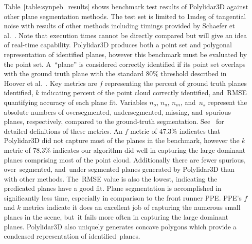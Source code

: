 Table~\ref{table:synpeb_results} shows benchmark test results of Polylidar3D against other plane segmentation methods. The test set is limited to 1mdeg of tangential noise with results of other methods including timings provided by Schaefer et al.~\cite{schaefer_maximum_2019}.  Note that execution times cannot be directly compared but will give an idea of real-time capability. Polylidar3D produces both a point set and polygonal representation of identified planes, however this benchmark must be evaluated by the point set.   A~``plane'' is considered correctly identified if its point set overlaps with the ground truth plane with the standard 80\% threshold described in Hoover et al.~\cite{hoover_experimental_1996}. Key metrics are $f$ representing the percent of ground truth planes identified, $k$ indicating percent of the point cloud correctly identified, and~RMSE quantifying accuracy of each plane fit. Variables $n_o$, $n_u$, $n_m$, and~$n_s$ represent the absolute numbers of  oversegmented,  undersegmented,  missing,  and~spurious  planes, respectively,  compared  to  the  ground-truth  segmentation. See~\cite{schaefer_maximum_2019,hoover_experimental_1996} for detailed definitions of these metrics. %
An $f$ metric of 47.3\% indicates that Polylidar3D did not capture most of the planes in the benchmark, however the $k$ metric of 78.3\% indicates our algorithm did well in capturing the large dominant planes comprising most of the point cloud.  Additionally there are fewer spurious, over~segmented, and~under segmented planes generated by Polylidar3D than with other methods. The~RMSE value is also the lowest, indicating the predicated planes have a good fit. Plane segmentation is accomplished in significantly less time, especially in comparison to the front runner PPE. PPE's $f$ and $k$ metrics indicate it does an excellent job of capturing the numerous small planes in the scene, but~it fails more often in capturing the large dominant planes.  Polylidar3D also uniquely generates concave polygons which provide a condensed representation of identified~planes.



